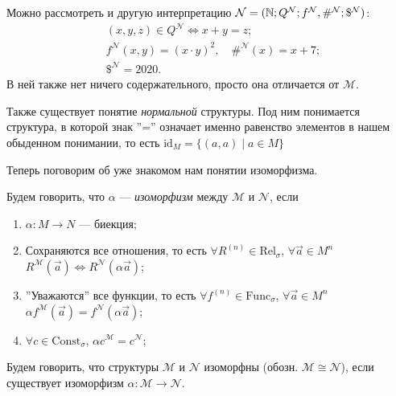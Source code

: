 \documentclass[a4paper, fleqn]{article}
\begin{document}
    Можно рассмотреть и другую интерпретацию $\mathcal{N} = (\mathbb{N}; Q^{\mathcal{N}}; f^{\mathcal{N}}, \#^{\mathcal{N}}; \$^{\mathcal{N}})$:
    \begin{align}
        &(x, y, z) \in Q^{\mathcal{N}} \iff x + y = z; \\
        &f^{\mathcal{N}}(x, y) = (x \cdot y)^{2}, \quad \#^{\mathcal{N}}(x) = x + 7; \\
        &\$^{\mathcal{N}} = 2020.
    \end{align}
    В ней также нет ничего содержательного, просто она отличается от $\mathcal{M}$.

    Также существует понятие \textit{нормальной} структуры. Под ним понимается структура, в которой
    знак ''='' означает именно равенство элементов в нашем обыденном понимании, то есть 
    $\text{id}_M = \{(a, a) \mid a \in M\}$

    Теперь поговорим об уже знакомом нам понятии изоморфизма.

    \begin{definition} \label{def::isomorphism-on-structures}
        Будем говорить, что $\alpha$ --- {\it изоморфизм} между $\mathcal{M}$ и $\mathcal{N}$, если
        \begin{enumerate}
            \item $\alpha \colon M \to N$ --- биекция;
            \item Сохраняются все отношения, то есть $\forall R^{(n)} \in \text{Rel}_{\sigma}$, $\forall \vec{a} \in M^{n}$ $R^{\mathcal{M}}(\vec{a}) \iff R^{\mathcal{N}}(\alpha \vec{a})$;
            \item ''Уважаются'' все функции, то есть $\forall f^{(n)} \in \text{Func}_{\sigma}$, $\forall \vec{a} \in M^{n}$ $\alpha f^{\mathcal{M}}(\vec{a}) = f^{\mathcal{N}}(\alpha \vec{a})$;
            \item $\forall c \in \text{Const}_{\sigma}$, $\alpha c^{\mathcal{M}} = c^{\mathcal{N}}$;
        \end{enumerate}
    \end{definition}
    
    \begin{definition}
        Будем говорить, что структуры $\mathcal{M}$ и $\mathcal{N}$ изоморфны (обозн. $\mathcal{M} \cong \mathcal{N}$), если существует изоморфизм $\alpha \colon \mathcal{M} \to \mathcal{N}$.
    \end{definition}
    
\end{document}
